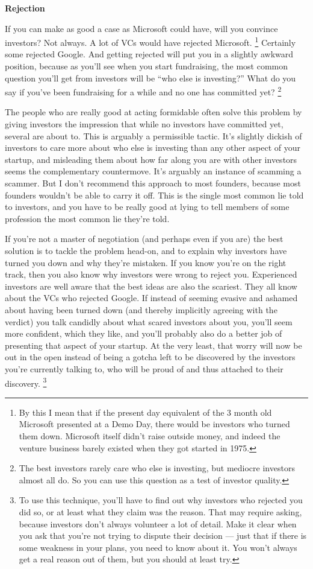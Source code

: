 \documentclass[12pt]{book}
\begin{document}
\textbf{Rejection}

If you can make as good a case as Microsoft could have, will you
convince investors? Not always. A lot of VCs would have rejected
Microsoft. \footnote{By this I mean that if the present day equivalent of the 3 month
old Microsoft presented at a Demo Day, there would be investors who
turned them down. Microsoft itself didn't raise outside money, and
indeed the venture business barely existed when they got started in
1975.} Certainly some rejected Google. And
getting rejected will put you in a slightly awkward position, because as
you'll see when you start fundraising, the most common question you'll
get from investors will be ``who else is investing?'' What do you say if
you've been fundraising for a while and no one has committed yet?
\footnote{The best investors rarely care who else is investing, but
mediocre investors almost all do. So you can use this question as a test
of investor quality.}

The people who are really good at acting formidable often solve this
problem by giving investors the impression that while no investors have
committed yet, several are about to. This is arguably a permissible
tactic. It's slightly dickish of investors to care more about who else
is investing than any other aspect of your startup, and misleading them
about how far along you are with other investors seems the complementary
countermove. It's arguably an instance of scamming a scammer. But I
don't recommend this approach to most founders, because most founders
wouldn't be able to carry it off. This is the single most common lie
told to investors, and you have to be really good at lying to tell
members of some profession the most common lie they're told.

If you're not a master of negotiation (and perhaps even if you are) the
best solution is to tackle the problem head-on, and to explain why
investors have turned you down and why they're mistaken. If you know
you're on the right track, then you also know why investors were wrong
to reject you. Experienced investors are well aware that the best ideas
are also the scariest. They all know about the VCs who rejected Google.
If instead of seeming evasive and ashamed about having been turned down
(and thereby implicitly agreeing with the verdict) you talk candidly
about what scared investors about you, you'll seem more confident, which
they like, and you'll probably also do a better job of presenting that
aspect of your startup. At the very least, that worry will now be out in
the open instead of being a gotcha left to be discovered by the
investors you're currently talking to, who will be proud of and thus
attached to their discovery. \footnote{To use this technique, you'll have to find out why investors
who rejected you did so, or at least what they claim was the reason.
That may require asking, because investors don't always volunteer a lot
of detail. Make it clear when you ask that you're not trying to dispute
their decision --- just that if there is some weakness in your plans,
you need to know about it. You won't always get a real reason out of
them, but you should at least try.}
\end{document}
